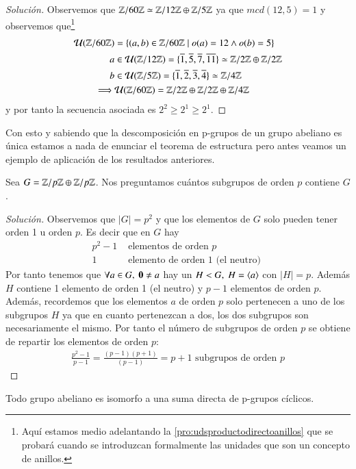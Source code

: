 \begin{proof}[Solución]
	Observemos que $\mathbb{Z}/60\mathbb{Z} \simeq \mathbb{Z}/12\mathbb{Z} \oplus \mathbb{Z}/5\mathbb{Z}$ ya que $mcd(12, 5) = 1$ y observemos que\footnote{Aquí estamos medio adelantando la \autoref{pro:udsproductodirectoanillos} que se probará cuando se introduzcan formalmente las unidades que son un concepto de anillos.}
	\begin{align*}
		\mathcal{U}(\mathbb{Z}/60\mathbb{Z}) &= \{(a,b) \in \mathbb{Z}/60\mathbb{Z} \mid o(a) = 12 \land o(b) = 5\} \\
		a &\in \mathcal{U}(\mathbb{Z}/12\mathbb{Z}) = \{\overline{1}, \overline{5}, \overline{7}, \overline{11}\} \simeq \mathbb{Z}/2\mathbb{Z} \oplus \mathbb{Z}/2\mathbb{Z} \\
		b &\in \mathcal{U}(\mathbb{Z}/5\mathbb{Z}) = \{\overline{1}, \overline{2}, \overline{3}, \overline{4}\} \simeq \mathbb{Z}/4\mathbb{Z} \\
		\implies& \mathcal{U}(\mathbb{Z}/60\mathbb{Z}) = \mathbb{Z}/2\mathbb{Z} \oplus \mathbb{Z}/2\mathbb{Z} \oplus \mathbb{Z}/4\mathbb{Z}
	\end{align*}
	y por tanto la secuencia asociada es $2^2 \geq 2^1 \geq 2^1$.
\end{proof}

Con esto y sabiendo que la descomposición en p-grupos de un grupo abeliano es única estamos a nada de enunciar el teorema de estructura pero antes veamos un ejemplo de aplicación de los resultados anteriores.

\begin{ej}
	Sea $G = \mathbb{Z}/p\mathbb{Z} \oplus \mathbb{Z}/p\mathbb{Z}$. Nos preguntamos cuántos subgrupos de orden $p$ contiene $G$.
\end{ej}

\begin{proof}[Solución]
	Observemos que $|G| = p^2$ y que los elementos de $G$ solo pueden tener orden 1 u orden $p$. Es decir que en $G$ hay
	\begin{align*}
		p^2-1 &\text{ elementos de orden } p \\
		1 &\text{ elemento de orden } 1 \text{ (el neutro) }
	\end{align*}
	Por tanto tenemos que $\forall a \in G,\ \mathbf{0} \neq a$ hay un $H < G,\ H = \langle a\rangle$ con $|H| = p$. Además $H$ contiene 1 elemento de orden 1 (el neutro) y $p-1$ elementos de orden $p$. Además, recordemos que los elementos $a$ de orden $p$ solo pertenecen a uno de los subgrupos $H$ ya que en cuanto pertenezcan a dos, los dos subgrupos son necesariamente el mismo. Por tanto el número de subgrupos de orden $p$ se obtiene de repartir los elementos de orden $p$:
	\begin{align*}
		 \frac{p^2-1}{p-1} = \frac{(p-1)(p+1)}{(p-1)} = p+1 \text{ subgrupos de orden } p
	\end{align*}
\end{proof}

\begin{thm}
	Todo grupo abeliano es isomorfo a una suma directa de p-grupos cíclicos. 
\end{thm}